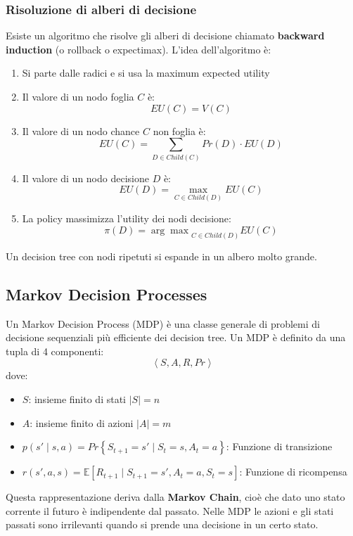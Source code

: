 \documentclass[a4paper]{article}
\begin{document}
\subsubsection{Risoluzione di alberi di decisione}
Esiste un algoritmo che risolve gli alberi di decisione chiamato \textbf{backward induction}
(o rollback o expectimax). L'idea dell'algoritmo è:
\begin{enumerate}
  \item Si parte dalle radici e si usa la maximum expected utility
  \item Il valore di un nodo foglia \( C \) è:
    \[
      EU(C) = V(C)
    \] 
  \item Il valore di un nodo chance \( C \) non foglia è:
    \[
      EU(C) = \sum_{D \in Child(C)} Pr(D) \cdot EU(D)
    \] 
  \item Il valore di un nodo decisione \( D \) è:
    \[
      EU(D) = \max_{C \in Child(D)} EU(C)
    \] 
  \item La policy massimizza l'utility dei nodi decisione:
    \[
      \pi(D) = {\arg\max}_{C \in Child(D)} EU(C)
    \] 
\end{enumerate}
Un decision tree con nodi ripetuti si espande in un albero molto grande.

\subsection{Markov Decision Processes}
Un Markov Decision Process (MDP) è una classe generale di problemi di decisione sequenziali
più efficiente dei decision tree. Un MDP è definito da una tupla di 4 componenti:
\[
  \left<S, A, R, Pr\right>
\] 
dove:
\begin{itemize}
  \item \( S \): insieme finito di stati \( |S| = n \) 
  \item \( A \): insieme finito di azioni \( |A| = m \)
  \item \( p(s' \;|\; s, a) = Pr \left\{ S_{t+1} = s' \;|\; S_t = s, A_t = a \right\} \): 
    Funzione di transizione
  \item \( r(s', a, s) = \mathbb{E}\left[ R_{t+1} \;|\; S_{t+1} = s', A_t = a, S_t = s \right] \):
    Funzione di ricompensa
\end{itemize}
Questa rappresentazione deriva dalla \textbf{Markov Chain}, cioè che dato uno stato corrente
il futuro è indipendente dal passato. Nelle MDP le azioni e gli stati passati sono
irrilevanti quando si prende una decisione in un certo stato.
\end{document}

